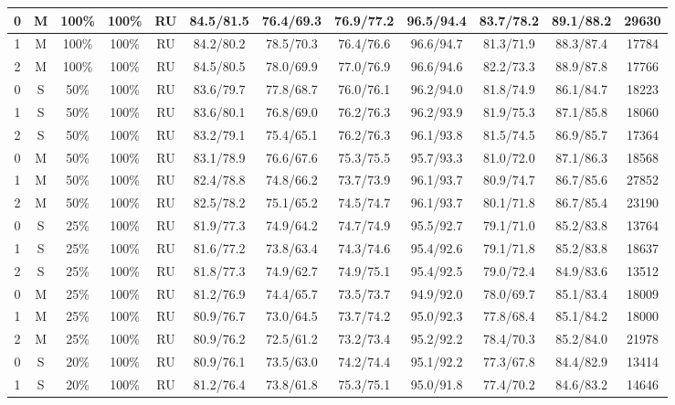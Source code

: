 \begin{table*}
{\begin{tabular}{|c|c|c|c|c||c|c|c|c|c|c||c|}
0 & M & 100\% & 100\% & RU & 84.5/81.5 & 76.4/69.3 & 76.9/77.2 & 96.5/94.4 & 83.7/78.2 & 89.1/88.2 & 29630 \\ \hline
1 & M & 100\% & 100\% & RU & 84.2/80.2 & 78.5/70.3 & 76.4/76.6 & 96.6/94.7 & 81.3/71.9 & 88.3/87.4 & 17784 \\ \hline
2 & M & 100\% & 100\% & RU & 84.5/80.5 & 78.0/69.9 & 77.0/76.9 & 96.6/94.6 & 82.2/73.3 & 88.9/87.8 & 17766 \\ \hline
0 & S & 50\% & 100\% & RU & 83.6/79.7 & 77.8/68.7 & 76.0/76.1 & 96.2/94.0 & 81.8/74.9 & 86.1/84.7 & 18223 \\ \hline
1 & S & 50\% & 100\% & RU & 83.6/80.1 & 76.8/69.0 & 76.2/76.3 & 96.2/93.9 & 81.9/75.3 & 87.1/85.8 & 18060 \\ \hline
2 & S & 50\% & 100\% & RU & 83.2/79.1 & 75.4/65.1 & 76.2/76.3 & 96.1/93.8 & 81.5/74.5 & 86.9/85.7 & 17364 \\ \hline
0 & M & 50\% & 100\% & RU & 83.1/78.9 & 76.6/67.6 & 75.3/75.5 & 95.7/93.3 & 81.0/72.0 & 87.1/86.3 & 18568 \\ \hline
1 & M & 50\% & 100\% & RU & 82.4/78.8 & 74.8/66.2 & 73.7/73.9 & 96.1/93.7 & 80.9/74.7 & 86.7/85.6 & 27852 \\ \hline
2 & M & 50\% & 100\% & RU & 82.5/78.2 & 75.1/65.2 & 74.5/74.7 & 96.1/93.7 & 80.1/71.8 & 86.7/85.4 & 23190 \\ \hline
0 & S & 25\% & 100\% & RU & 81.9/77.3 & 74.9/64.2 & 74.7/74.9 & 95.5/92.7 & 79.1/71.0 & 85.2/83.8 & 13764 \\ \hline
1 & S & 25\% & 100\% & RU & 81.6/77.2 & 73.8/63.4 & 74.3/74.6 & 95.4/92.6 & 79.1/71.8 & 85.2/83.8 & 18637 \\ \hline
2 & S & 25\% & 100\% & RU & 81.8/77.3 & 74.9/62.7 & 74.9/75.1 & 95.4/92.5 & 79.0/72.4 & 84.9/83.6 & 13512 \\ \hline
0 & M & 25\% & 100\% & RU & 81.2/76.9 & 74.4/65.7 & 73.5/73.7 & 94.9/92.0 & 78.0/69.7 & 85.1/83.4 & 18009 \\ \hline
1 & M & 25\% & 100\% & RU & 80.9/76.7 & 73.0/64.5 & 73.7/74.2 & 95.0/92.3 & 77.8/68.4 & 85.1/84.2 & 18000 \\ \hline
2 & M & 25\% & 100\% & RU & 80.9/76.2 & 72.5/61.2 & 73.2/73.4 & 95.2/92.2 & 78.4/70.3 & 85.2/84.0 & 21978 \\ \hline
0 & S & 20\% & 100\% & RU & 80.9/76.1 & 73.5/63.0 & 74.2/74.4 & 95.1/92.2 & 77.3/67.8 & 84.4/82.9 & 13414 \\ \hline
1 & S & 20\% & 100\% & RU & 81.2/76.4 & 73.8/61.8 & 75.3/75.1 & 95.0/91.8 & 77.4/70.2 & 84.6/83.2 & 14646 \\ \hline

\end{tabular}}
\end{table*}
